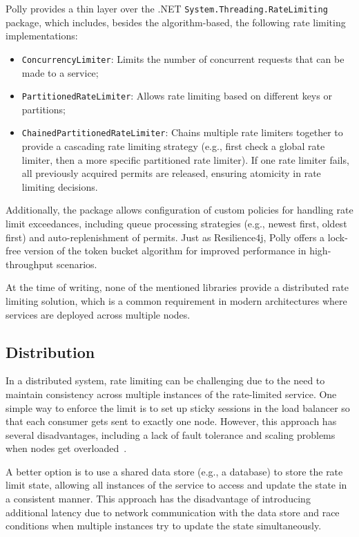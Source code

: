 Polly provides a thin layer over the .NET \texttt{System.Threading.RateLimiting}~\cite{microsoft-rate-limiting-dotnet} package, which includes, besides the algorithm-based, the following rate limiting implementations:
\begin{itemize}
    \item \texttt{ConcurrencyLimiter}: Limits the number of concurrent requests that can be made to a service;
    \item \texttt{PartitionedRateLimiter}: Allows rate limiting based on different keys or partitions;
    \item \texttt{ChainedPartitionedRateLimiter}:
    Chains multiple rate limiters together to provide a cascading rate limiting strategy (e.g., first check a global rate limiter, then a more specific partitioned rate limiter).
    If one rate limiter fails, all previously acquired permits are released, ensuring atomicity in rate limiting decisions.
\end{itemize}

Additionally, the package allows configuration of custom policies for handling rate limit exceedances, including queue processing strategies (e.g., newest first, oldest first) and auto-replenishment of permits.
Just as Resilience4j, Polly offers a lock-free version of the token bucket algorithm for improved performance in high-throughput scenarios.

At the time of writing, none of the mentioned libraries provide a distributed rate limiting solution,
which is a common requirement in modern architectures where services are deployed across multiple nodes.

\subsection{Distribution}\label{subsec:rate-limiter-distribution}

In a distributed system,
rate limiting can be challenging due to the need
to maintain consistency across multiple instances of the rate-limited service.
One simple way to enforce the limit is
to set up sticky sessions in the load balancer so that each consumer gets sent to exactly one node.
However, this approach has several disadvantages,
including a lack of fault tolerance and scaling problems when nodes get overloaded~\cite{kong-rate-limiting}.

A better option is to use a shared data store (e.g., a database) to store the rate limit state,
allowing all instances of the service to access and update the state in a consistent manner.
This approach has the disadvantage
of introducing additional latency due to network communication with the data store and race conditions when
multiple instances try to update the state simultaneously.

